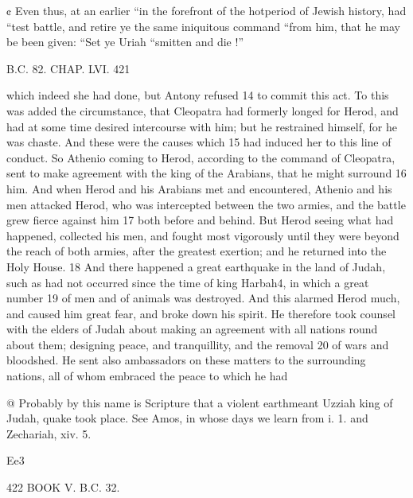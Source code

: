 ¢ Even thus, at an earlier “in the forefront of the hotperiod of Jewish history, had “test battle, and retire ye the same iniquitous command “from him, that he may be been given: “Set ye Uriah “smitten and die !” 

B.C. 82. CHAP. LVI. 421 

which indeed she had done, but Antony refused 
14 to commit this act. To this was added the circumstance, that Cleopatra had formerly longed for Herod, and had at some time desired intercourse with him; but he restrained himself, for he was chaste. And these were the causes which 
15 had induced her to this line of conduct. So Athenio coming to Herod, according to the command of Cleopatra, sent to make agreement with the king of the Arabians, that he might surround 
16 him. And when Herod and his Arabians met and encountered, Athenio and his men attacked Herod, who was intercepted between the two armies, and the battle grew fierce against him 
17 both before and behind. But Herod seeing what had happened, collected his men, and fought most vigorously until they were beyond the reach of both armies, after the greatest exertion; and he returned into the Holy House. 
18 And there happened a great earthquake in the land of Judah, such as had not occurred since the time of king Harbah4, in which a great number 
19 of men and of animals was destroyed. And this alarmed Herod much, and caused him great fear, and broke down his spirit. He therefore took counsel with the elders of Judah about making an agreement with all nations round about them; designing peace, and tranquillity, and the removal 
20 of wars and bloodshed. He sent also ambassadors on these matters to the surrounding nations, all of whom embraced the peace to which he had 

@ Probably by this name is Scripture that a violent earthmeant Uzziah king of Judah, quake took place. See Amos, in whose days we learn from i. 1. and Zechariah, xiv. 5. 

Ee3 




422 BOOK V. B.C. 32. 

